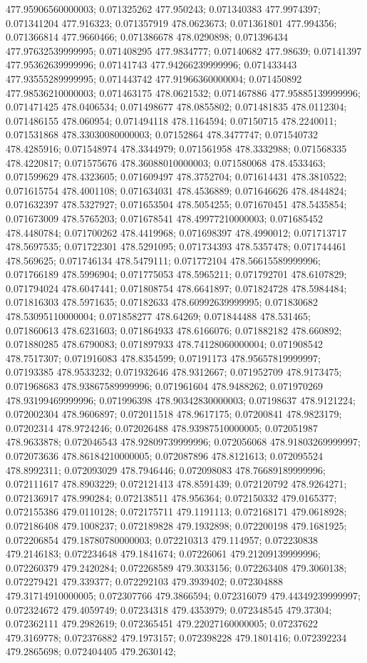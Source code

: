477.95906560000003; 0.071325262 477.950243; 0.071340383 477.9974397; 0.071341204 477.916323; 0.071357919 478.0623673; 0.071361801 477.994356; 0.071366814 477.9660466; 0.071386678 478.0290898; 0.071396434 477.97632539999995; 0.071408295 477.9834777; 0.07140682 477.98639; 0.07141397 477.95362639999996; 0.07141743 477.94266239999996; 0.071433443 477.93555289999995; 0.071443742 477.91966360000004; 0.071450892 477.98536210000003; 0.071463175 478.0621532; 0.071467886 477.95885139999996; 0.071471425 478.0406534; 0.071498677 478.0855802; 0.071481835 478.0112304; 0.071486155 478.060954; 0.071494118 478.1164594; 0.07150715 478.2240011; 0.071531868 478.33030080000003; 0.07152864 478.3477747; 0.071540732 478.4285916; 0.071548974 478.3344979; 0.071561958 478.3332988; 0.071568335 478.4220817; 0.071575676 478.36088010000003; 0.071580068 478.4533463; 0.071599629 478.4323605; 0.071609497 478.3752704; 0.071614431 478.3810522; 0.071615754 478.4001108; 0.071634031 478.4536889; 0.071646626 478.4844824; 0.071632397 478.5327927; 0.071653504 478.5054255; 0.071670451 478.5435854; 0.071673009 478.5765203; 0.071678541 478.49977210000003; 0.071685452 478.4480784; 0.071700262 478.4419968; 0.071698397 478.4990012; 0.071713717 478.5697535; 0.071722301 478.5291095; 0.071734393 478.5357478; 0.071744461 478.569625; 0.071746134 478.5479111; 0.071772104 478.56615589999996; 0.071766189 478.5996904; 0.071775053 478.5965211; 0.071792701 478.6107829; 0.071794024 478.6047441; 0.071808754 478.6641897; 0.071824728 478.5984484; 0.071816303 478.5971635; 0.07182633 478.60992639999995; 0.071830682 478.53095110000004; 0.071858277 478.64269; 0.071844488 478.531465; 0.071860613 478.6231603; 0.071864933 478.6166076; 0.071882182 478.660892; 0.071880285 478.6790083; 0.071897933 478.74128060000004; 0.071908542 478.7517307; 0.071916083 478.8354599; 0.07191173 478.95657819999997; 0.07193385 478.9533232; 0.071932646 478.9312667; 0.071952709 478.9173475; 0.071968683 478.93867589999996; 0.071961604 478.9488262; 0.071970269 478.93199469999996; 0.071996398 478.90342830000003; 0.07198637 478.9121224; 0.072002304 478.9606897; 0.072011518 478.9617175; 0.07200841 478.9823179; 0.07202314 478.9724246; 0.072026488 478.93987510000005; 0.072051987 478.9633878; 0.072046543 478.92809739999996; 0.072056068 478.91803269999997; 0.072073636 478.86184210000005; 0.072087896 478.8121613; 0.072095524 478.8992311; 0.072093029 478.7946446; 0.072098083 478.76689189999996; 0.072111617 478.8903229; 0.072121413 478.8591439; 0.072120792 478.9264271; 0.072136917 478.990284; 0.072138511 478.956364; 0.072150332 479.0165377; 0.072155386 479.0110128; 0.072175711 479.1191113; 0.072168171 479.0618928; 0.072186408 479.1008237; 0.072189828 479.1932898; 0.072200198 479.1681925; 0.072206854 479.18780780000003; 0.072210313 479.114957; 0.072230838 479.2146183; 0.072234648 479.1841674; 0.07226061 479.21209139999996; 0.072260379 479.2420284; 0.072268589 479.3033156; 0.072263408 479.3060138; 0.072279421 479.339377; 0.072292103 479.3939402; 0.072304888 479.31714910000005; 0.072307766 479.3866594; 0.072316079 479.44349239999997; 0.072324672 479.4059749; 0.07234318 479.4353979; 0.072348545 479.37304; 0.072362111 479.2982619; 0.072365451 479.22027160000005; 0.07237622 479.3169778; 0.072376882 479.1973157; 0.072398228 479.1801416; 0.072392234 479.2865698; 0.072404405 479.2630142; 